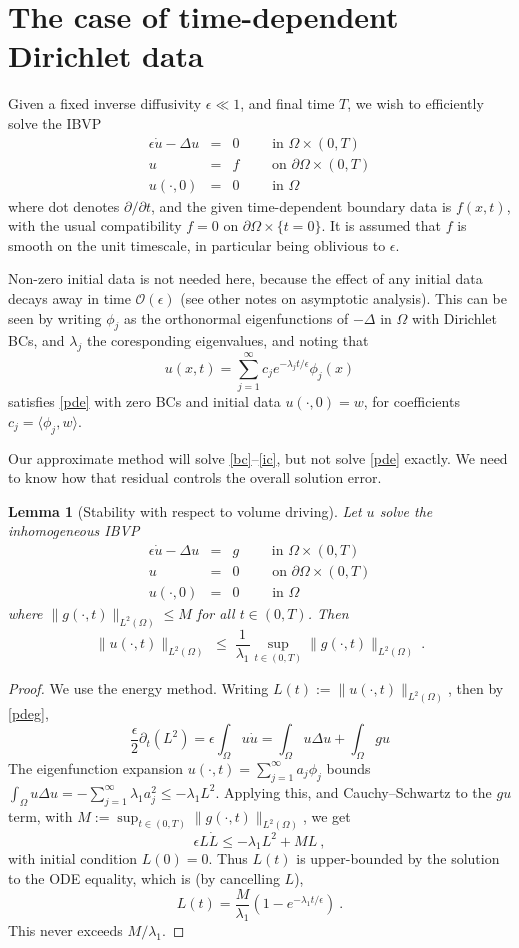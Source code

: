\documentclass[10pt]{article}
\newcommand{\be}{\begin{equation}}
\newcommand{\ee}{\end{equation}}
\newcommand{\bea}{\begin{eqnarray}}
\newcommand{\eea}{\end{eqnarray}}
\newcommand{\bigO}{{\mathcal O}}
\newtheorem{lem}[thm]{Lemma}
\newcommand{\pO}{{\partial\Omega}}
\newcommand{\eps}{\epsilon}
\newcommand{\dt}{\partial_t}
\newcommand{\LTO}{{L^2(\Omega)}}
\begin{document}
\section{The case of time-dependent Dirichlet data}

Given a fixed inverse diffusivity $\eps\ll 1$,
and final time $T$,
we wish to efficiently solve the IBVP
\bea
\eps\dot{u} - \Delta u &=& 0    \qquad \mbox{ in } \Omega\times (0,T)
\label{pde}
\\
u  &=& f  \qquad \mbox{ on } \pO \times (0,T)
\label{bc}
\\
u(\cdot, 0)    &=&  0 \qquad \mbox{ in } \Omega
\label{ic}
\eea
where dot denotes $\partial/\partial t$, and the given
time-dependent boundary data is $f(x,t)$,
with the usual compatibility $f=0$ on  $\pO\times\{t=0\}$.
It is assumed that $f$ is smooth on the unit timescale, in particular
being oblivious to $\eps$.

Non-zero initial data is not needed here,
because the effect of any initial data decays away
in time $\bigO(\eps)$ (see other notes on asymptotic analysis).
This can be seen by writing $\phi_j$ as the orthonormal eigenfunctions
of $-\Delta$ in $\Omega$ with Dirichlet BCs, and $\lambda_j$
the coresponding eigenvalues, and noting that
$$
u(x,t) = \sum_{j=1}^\infty c_j e^{-\lambda_jt/\eps} \phi_j(x)
$$
satisfies \eqref{pde} with zero BCs and initial data $u(\cdot,0)=w$,
for coefficients $c_j = \langle \phi_j, w \rangle$.

Our approximate method will solve \eqref{bc}--\eqref{ic}, but
not solve \eqref{pde} exactly.
We need to know how that residual controls the overall solution error.

\begin{lem}[Stability with respect to volume driving]
  Let $u$ solve the inhomogeneous IBVP
\bea
\eps\dot{u} - \Delta u &=& g    \qquad \mbox{ in } \Omega\times (0,T)
\label{pdeg}
\\
u  &=& 0  \qquad \mbox{ on } \pO \times (0,T)
\label{bc0}
\\
u(\cdot, 0)    &=&  0 \qquad \mbox{ in } \Omega
\eea
where $\|g(\cdot,t)\|_\LTO \le M$ for all $t\in(0,T)$.
Then
\be
\|u(\cdot,t)\|_\LTO \;\le\;
\frac{1}{\lambda_1}\sup_{t\in(0,T)}\|g(\cdot,t)\|_\LTO~.
\label{gstab}
\ee
\label{l:gstab}
\end{lem}
\begin{proof}
We use the energy method.
Writing $L(t):=\|u(\cdot,t)\|_\LTO$, then by \eqref{pdeg},
$$
\frac{\eps}{2}\dt(L^2) = \eps\int_\Omega u \dot u = \int_\Omega
u\Delta u + \int_\Omega g u
$$
The eigenfunction expansion
$u(\cdot,t) = \sum_{j=1}^\infty a_j \phi_j$
bounds $\int_\Omega u\Delta u = -\sum_{j=1}^\infty \lambda_1 a_j^2
\le -\lambda_1 L^2$.
Applying this, and Cauchy--Schwartz to the $gu$ term, with $M:=\sup_{t\in(0,T)}\|g(\cdot,t)\|_\LTO$,
we get
$$
\eps L\dot L \le -\lambda_1 L^2 + ML~,
$$
with initial condition $L(0)=0$.
Thus $L(t)$ is upper-bounded by the solution to the ODE equality,
which is (by cancelling $L$),
$$
L(t) = \frac{M}{\lambda_1} (1 - e^{-\lambda_1 t / \eps})~.
$$
This never exceeds $M/\lambda_1$.
\end{proof}
\end{document}
